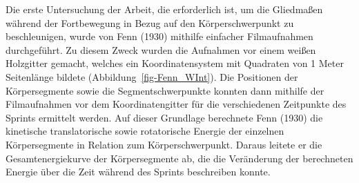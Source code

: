 \documentclass[
  letterpaper,
  DIV=11]{scrartcl}
\begin{document}
Die erste Untersuchung der Arbeit, die erforderlich ist, um die
Gliedmaßen während der Fortbewegung in Bezug auf den Körperschwerpunkt
zu beschleunigen, wurde von Fenn (1930) mithilfe einfacher Filmaufnahmen
durchgeführt. Zu diesem Zweck wurden die Aufnahmen vor einem weißen
Holzgitter gemacht, welches ein Koordinatensystem mit Quadraten von 1
Meter Seitenlänge bildete (Abbildung~\ref{fig-Fenn_WInt}). Die
Positionen der Körpersegmente sowie die Segmentschwerpunkte konnten dann
mithilfe der Filmaufnahmen vor dem Koordinatengitter für die
verschiedenen Zeitpunkte des Sprints ermittelt werden. Auf dieser
Grundlage berechnete Fenn (1930) die kinetische translatorische sowie
rotatorische Energie der einzelnen Körpersegmente in Relation zum
Körperschwerpunkt. Daraus leitete er die Gesamtenergiekurve der
Körpersegmente ab, die die Veränderung der berechneten Energie über die
Zeit während des Sprints beschreiben konnte.
\end{document}
